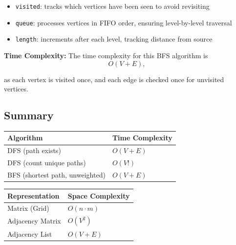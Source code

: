 \begin{itemize}
  \item \texttt{visited}: tracks which vertices have been seen to avoid revisiting
  \item \texttt{queue}: processes vertices in FIFO order, ensuring level-by-level traversal
  \item \texttt{length}: increments after each level, tracking distance from source
\end{itemize}

\textbf{Time Complexity:} 
The time complexity for this BFS algorithm is
\[
O(V + E),
\]

as each vertex is visited once, and each edge is checked once for unvisited vertices.

\subsection{Summary}

\begin{center}
\begin{tabular}{|l|l|}
\hline
\textbf{Algorithm} & \textbf{Time Complexity} \\
\hline
DFS (path exists) & $O(V + E)$ \\
\hline
DFS (count unique paths) & $O(V!)$ \\
\hline
BFS (shortest path, unweighted) & $O(V + E)$ \\
\hline
\end{tabular}
\end{center}

\begin{center}
\begin{tabular}{|l|l|}
\hline
\textbf{Representation} & \textbf{Space Complexity} \\
\hline
Matrix (Grid) & $O(n \cdot m)$ \\
\hline
Adjacency Matrix & $O(V^2)$ \\
\hline
Adjacency List & $O(V + E)$ \\
\hline
\end{tabular}
\end{center}
